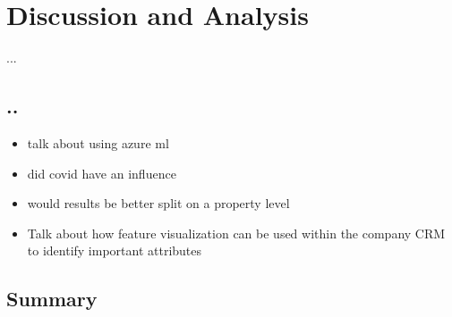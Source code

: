\chapter{Discussion and Analysis}
...

\section{..}
\begin{itemize}
\item talk about using azure ml 
\item did covid have an influence
\item would results be better split on a property level
\item Talk about how feature visualization can be used within the company CRM to identify important attributes 
\end{itemize}










\section{Summary}